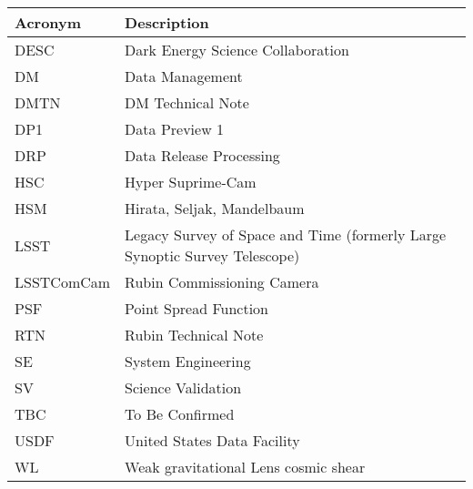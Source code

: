 \addtocounter{table}{-1}
\begin{longtable}{p{}p{}}\hline
\textbf{Acronym} & \textbf{Description}  \\\hline

DESC & Dark Energy Science Collaboration \\\hline
DM & Data Management \\\hline
DMTN & DM Technical Note \\\hline
DP1 & Data Preview 1 \\\hline
DRP & Data Release Processing \\\hline
HSC & Hyper Suprime-Cam \\\hline
HSM & Hirata, Seljak, Mandelbaum \\\hline
LSST & Legacy Survey of Space and Time (formerly Large Synoptic Survey Telescope) \\\hline
LSSTComCam & Rubin Commissioning Camera \\\hline
PSF & Point Spread Function \\\hline
RTN & Rubin Technical Note \\\hline
SE & System Engineering \\\hline
SV & Science Validation \\\hline
TBC & To Be Confirmed \\\hline
USDF & United States Data Facility \\\hline
WL & Weak gravitational Lens cosmic shear \\\hline
\end{longtable}
